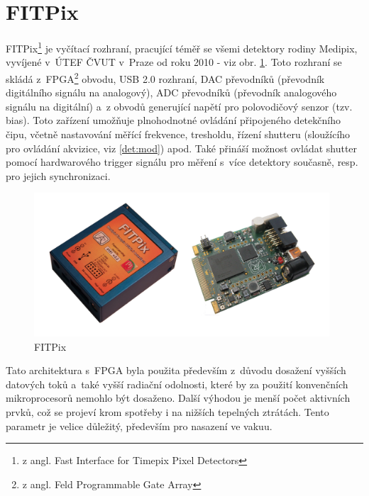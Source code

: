 \section{FITPix}\label{det:fitpix}
FITPix\footnote{z angl. Fast Interface for Timepix Pixel Detectors} \cite{fitpix} je vyčítací rozhraní, pracující téměř se všemi detektory rodiny Medipix, vyvíjené v~ÚTEF ČVUT v~Praze od roku 2010 - viz obr. \ref{fig:det:fitpix}. Toto rozhraní se skládá z~FPGA\footnote{z angl. Feld Programmable Gate Array} obvodu, USB 2.0 rozhraní, DAC převodníků (převodník digitálního signálu na analogový), ADC převodníků (převodník analogového signálu na digitální) a~z obvodů generující napětí pro polovodičový senzor (tzv. bias). Toto zařízení umožňuje plnohodnotné ovládání připojeného detekčního čipu, včetně nastavování měřící frekvence, tresholdu, řízení shutteru (sloužícího pro ovládání akvizice, viz \ref{det:mod}) apod. Také přináší možnost ovládat shutter pomocí hardwarového trigger signálu pro měření s~více detektory současně, resp. pro jejich synchronizaci.

\begin{figure}[th!]
	\begin{center}
		\includegraphics[width=11cm]{figures/fitpix.png}
		\caption{FITPix}
		\label{fig:det:fitpix}
	\end{center}
\end{figure}

Tato architektura s~FPGA byla použita především z~důvodu dosažení vyšších datových toků a~také vyšší radiační odolnosti, které by za použití konvenčních mikroprocesorů nemohlo být dosaženo. Další výhodou je menší počet aktivních prvků, což se projeví krom spotřeby i na nižších tepelných ztrátách. Tento parametr je velice důležitý, především pro nasazení ve vakuu.

